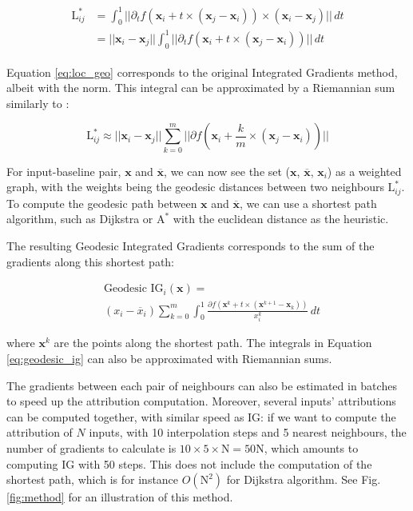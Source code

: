 \begin{align}
\begin{split}
    \textrm{L}^*_{ij} &= \int_0^1 ||\partial_t f(\textbf{x}_i + t \times (\textbf{x}_j - \textbf{x}_i)) \times (\textbf{x}_i - \textbf{x}_j) || \, dt \\
    &= ||\textbf{x}_i - \textbf{x}_j|| \int_0^1 ||\partial_t f(\textbf{x}_i + t \times (\textbf{x}_j - \textbf{x}_i))|| \, dt
\end{split}
\label{eq:loc_geo}
\end{align}

Equation \ref{eq:loc_geo} corresponds to the original Integrated Gradients method, albeit with the norm. This integral can be approximated by a Riemannian sum similarly to \cite{sundararajan2017axiomatic}: 

\begin{equation}
    \textrm{L}^*_{ij} \approx ||\textbf{x}_i - \textbf{x}_j|| \sum_{k=0}^m || \partial f(\textbf{x}_i + \frac{k}{m} \times (\textbf{x}_j - \textbf{x}_i))||
\label{eq:log_geo_approx}
\end{equation}

For input-baseline pair, $\textbf{x}$ and $\overline{\textbf{x}}$, we can now see the set ($\textbf{x}$, $\overline{\textbf{x}}$, $\textbf{x}_i$) as a weighted graph, with the weights being the geodesic distances between two neighbours $\textrm{L}^*_{ij}$. To compute the geodesic path between $\textbf{x}$ and $\overline{\textbf{x}}$, we can use a shortest path algorithm, such as Dijkstra or $\textrm{A}^*$ with the euclidean distance as the heuristic.

The resulting Geodesic Integrated Gradients corresponds to the sum of the gradients along this shortest path:

\begin{equation}
\begin{split}
    & \textrm{Geodesic IG}_i(\textbf{x}) = \\ & (x_i - \overline{x}_i) \sum_{k=0}^m \int_0^1 \frac{\partial f(\textbf{x}^k + t \times (\textbf{x}^{k+1} - \textbf{x}_k))}{x^k_i} \, dt
\end{split}
\label{eq:geodesic_ig}
\end{equation}

where $\textbf{x}^k$ are the points along the shortest path. The integrals in Equation \ref{eq:geodesic_ig} can also be approximated with Riemannian sums.

The gradients between each pair of neighbours can also be estimated in batches to speed up the attribution computation. Moreover, several inputs' attributions can be computed together, with similar speed as IG: if we want to compute the attribution of $N$ inputs, with 10 interpolation steps and 5 nearest neighbours, the number of gradients to calculate is $10 \times 5 \times \textrm{N} = 50 \textrm{N}$, which amounts to computing IG with 50 steps. This does not include the computation of the shortest path, which is for instance $O(\textrm{N}^2)$ for Dijkstra algorithm. See Fig. \ref{fig:method} for an illustration of this method.

